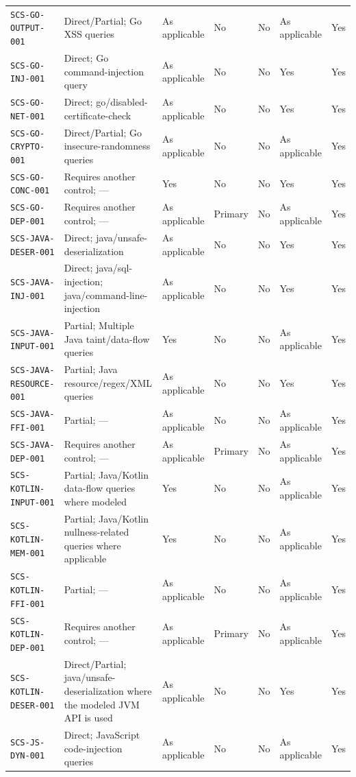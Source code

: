 \documentclass[10pt,letterpaper]{article}
\newcommand{\code}[1]{\begingroup\small\ttfamily\def\UrlFont{\ttfamily}\nolinkurl{#1}\endgroup}
\begin{document}
\begin{landscape}
\begin{longtable}{@{}P{1.4in}P{1.35in}P{1.1in}P{1.1in}P{0.95in}P{1.3in}P{1.0in}@{}}
\code{SCS-GO-OUTPUT-001} & Direct/Partial; Go XSS queries & As applicable & No & No & As applicable & Yes\\
\code{SCS-GO-INJ-001} & Direct; Go command-injection query & As applicable & No & No & Yes & Yes\\
\code{SCS-GO-NET-001} & Direct; go/disabled-certificate-check & As applicable & No & No & Yes & Yes\\
\code{SCS-GO-CRYPTO-001} & Direct/Partial; Go insecure-randomness queries & As applicable & No & No & As applicable & Yes\\
\code{SCS-GO-CONC-001} & Requires another control; — & Yes & No & No & Yes & Yes\\
\code{SCS-GO-DEP-001} & Requires another control; — & As applicable & Primary & No & As applicable & Yes\\
\code{SCS-JAVA-DESER-001} & Direct; java/unsafe-deserialization & As applicable & No & No & Yes & Yes\\
\code{SCS-JAVA-INJ-001} & Direct; java/sql-injection; java/command-line-injection & As applicable & No & No & Yes & Yes\\
\code{SCS-JAVA-INPUT-001} & Partial; Multiple Java taint/data-flow queries & Yes & No & No & As applicable & Yes\\
\code{SCS-JAVA-RESOURCE-001} & Partial; Java resource/regex/XML queries & As applicable & No & No & Yes & Yes\\
\code{SCS-JAVA-FFI-001} & Partial; — & As applicable & No & No & As applicable & Yes\\
\code{SCS-JAVA-DEP-001} & Requires another control; — & As applicable & Primary & No & As applicable & Yes\\
\code{SCS-KOTLIN-INPUT-001} & Partial; Java/Kotlin data-flow queries where modeled & Yes & No & No & As applicable & Yes\\
\code{SCS-KOTLIN-MEM-001} & Partial; Java/Kotlin nullness-related queries where applicable & Yes & No & No & As applicable & Yes\\
\code{SCS-KOTLIN-FFI-001} & Partial; — & As applicable & No & No & As applicable & Yes\\
\code{SCS-KOTLIN-DEP-001} & Requires another control; — & As applicable & Primary & No & As applicable & Yes\\
\code{SCS-KOTLIN-DESER-001} & Direct/Partial; java/unsafe-deserialization where the modeled JVM API is used & As applicable & No & No & Yes & Yes\\
\code{SCS-JS-DYN-001} & Direct; JavaScript code-injection queries & As applicable & No & No & As applicable & Yes\\

\end{longtable}
\end{landscape}
\end{document}
